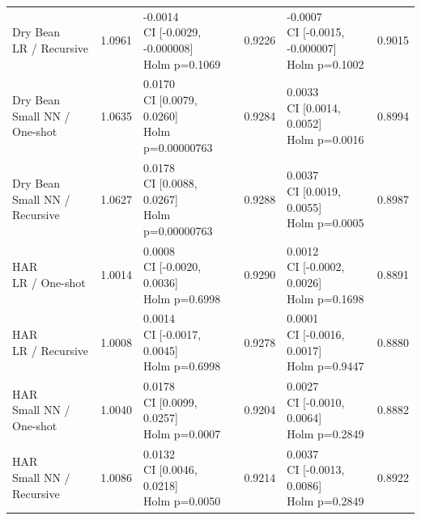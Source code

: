 \begin{table}[t]
\begin{tabular}{llllll}
\shortstack{Dry Bean\\LR / Recursive} & 1.0961 & \shortstack{-0.0014\\CI [-0.0029, -0.000008]\\Holm p=0.1069} & 0.9226 & \shortstack{-0.0007\\CI [-0.0015, -0.000007]\\Holm p=0.1002} & 0.9015 \\
\shortstack{Dry Bean\\Small NN / One-shot} & 1.0635 & \shortstack{0.0170\\CI [0.0079, 0.0260]\\Holm p=0.00000763} & 0.9284 & \shortstack{0.0033\\CI [0.0014, 0.0052]\\Holm p=0.0016} & 0.8994 \\
\shortstack{Dry Bean\\Small NN / Recursive} & 1.0627 & \shortstack{0.0178\\CI [0.0088, 0.0267]\\Holm p=0.00000763} & 0.9288 & \shortstack{0.0037\\CI [0.0019, 0.0055]\\Holm p=0.0005} & 0.8987 \\
\shortstack{HAR\\LR / One-shot} & 1.0014 & \shortstack{0.0008\\CI [-0.0020, 0.0036]\\Holm p=0.6998} & 0.9290 & \shortstack{0.0012\\CI [-0.0002, 0.0026]\\Holm p=0.1698} & 0.8891 \\
\shortstack{HAR\\LR / Recursive} & 1.0008 & \shortstack{0.0014\\CI [-0.0017, 0.0045]\\Holm p=0.6998} & 0.9278 & \shortstack{0.0001\\CI [-0.0016, 0.0017]\\Holm p=0.9447} & 0.8880 \\
\shortstack{HAR\\Small NN / One-shot} & 1.0040 & \shortstack{0.0178\\CI [0.0099, 0.0257]\\Holm p=0.0007} & 0.9204 & \shortstack{0.0027\\CI [-0.0010, 0.0064]\\Holm p=0.2849} & 0.8882 \\
\shortstack{HAR\\Small NN / Recursive} & 1.0086 & \shortstack{0.0132\\CI [0.0046, 0.0218]\\Holm p=0.0050} & 0.9214 & \shortstack{0.0037\\CI [-0.0013, 0.0086]\\Holm p=0.2849} & 0.8922 \\
\hline
\end{tabular}
\end{table}

